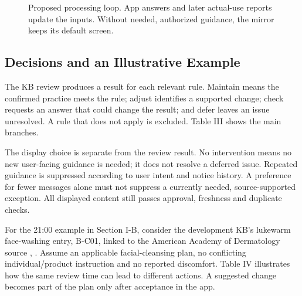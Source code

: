 \documentclass[conference,letterpaper]{IEEEtran}
\begin{document}
\begin{figure}[!t]
\centering
{}
\caption{Proposed processing loop. App answers and later actual-use reports update the inputs. Without needed, authorized guidance, the mirror keeps its default screen.}\label{fig:flow}
\end{figure}

\subsection{Decisions and an Illustrative Example}

The KB review produces a result for each relevant rule. Maintain means the confirmed practice meets the rule; adjust identifies a supported change; check requests an answer that could change the result; and defer leaves an issue unresolved. A rule that does not apply is excluded. Table III shows the main branches.

The display choice is separate from the review result. No intervention means no new user-facing guidance is needed; it does not resolve a deferred issue. Repeated guidance is suppressed according to user intent and notice history. A preference for fewer messages alone must not suppress a currently needed, source-supported exception. All displayed content still passes approval, freshness and duplicate checks.

For the 21:00 example in Section I-B, consider the development KB's lukewarm face-washing entry, B-C01, linked to the American Academy of Dermatology source \cite{ref13}, \cite{ref3}. Assume an applicable facial-cleansing plan, no conflicting individual/product instruction and no reported discomfort. Table IV illustrates how the same review time can lead to different actions. A suggested change becomes part of the plan only after acceptance in the app.
\end{document}
